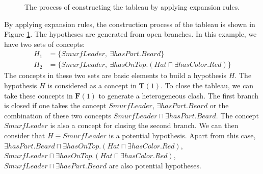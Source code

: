 \documentclass{article}
\begin{document}
\begin{figure}
\caption{The process of constructing the tableau by applying expansion rules.}\label{fig:grandst}
\end{figure}

By applying expansion rules, the construction process of the tableau is shown in Figure \ref{fig:grandst}. The hypotheses are generated from open branches.
In this example, we have two sets of concepts:
\begin{align*}
H_1&=\{SmurfLeader,~\exists hasPart.Beard\}\\
H_2&=\{SmurfLeader,~\exists hasOnTop.(Hat \sqcap  \exists hasColor.Red)\}
\end{align*}
The concepts in these two sets are basic elements to build a hypothesis $H$. The hypothesis $H$ is considered as a concept in $\mathbf{T}(1)$.
To close the tableau, we can take these concepts in $\mathbf{F}(1)$ to generate a heterogeneous clash.
The first branch is closed if one takes the concept $SmurfLeader$, $\exists hasPart.Beard$ or the combination of these two concepts
$SmurfLeader \sqcap \exists hasPart.Beard$. The concept $SmurfLeader$ is also a concept for closing the second branch. We can then consider that $H\equiv SmurfLeader$
is a potential hypothesis. Apart from this case, $\exists hasPart. Beard \sqcap \exists hasOnTop.(Hat \sqcap \exists hasColor.Red)$,
$SmurfLeader \sqcap \exists hasOnTop.(Hat \sqcap \exists hasColor.Red)$, $SmurfLeader \sqcap \exists hasPart.Beard$ are also potential hypotheses.
\end{document}
